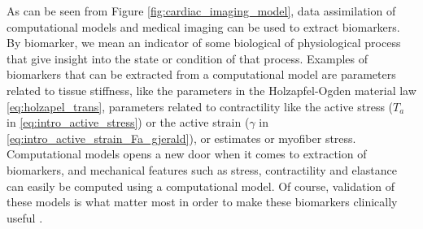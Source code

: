 As can be seen from Figure \ref{fig:cardiac_imaging_model}, data
assimilation of computational models and medical imaging can be used to
extract biomarkers. By biomarker, we mean an indicator of some
biological of physiological process that give insight into the state
or condition of that process. Examples of biomarkers that can be
extracted from a computational model are parameters related to tissue
stiffness, like the parameters in the Holzapfel-Ogden material law
\eqref{eq:holzapel_trans}, parameters related to contractility like
the active stress ($T_a$ in \eqref{eq:intro_active_stress}) or the
active strain ($\gamma$ in \eqref{eq:intro_active_strain_Fa_gjerald}),
or estimates or myofiber stress.
Computational models opens a new door when it comes to extraction of
biomarkers, and mechanical features such as stress, contractility and
elastance can easily be computed using a computational model. Of
course, validation of these models is what matter most in order to
make these biomarkers clinically useful \cite{caruel2014dimensional}. 









